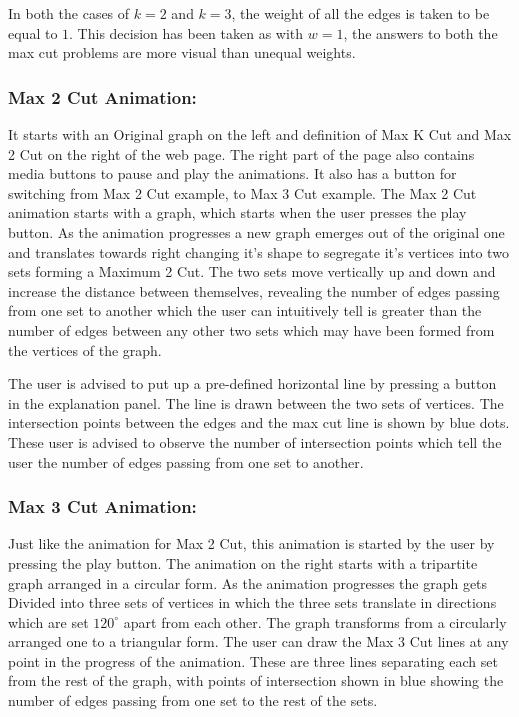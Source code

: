 In both the cases of $k=2$ and $k=3$, the weight of all the edges is taken to
be equal to $1$. This decision has been taken as with $w=1$, the answers to
both the max cut problems are more visual than unequal weights.

\subsubsection{Max 2 Cut Animation:} 
It starts with an Original graph on the left and definition of Max K Cut and
Max 2 Cut on the right of the web page. The right part of the page also
contains media buttons to pause and play the animations. It also has a button
for switching from Max 2 Cut example, to Max 3 Cut example.  The Max 2 Cut
animation starts with a graph, which starts when the user presses the play
button. As the animation progresses a new graph emerges out of the original
one and translates towards right changing it's shape to segregate it's
vertices into two sets forming a Maximum 2 Cut. The two sets move vertically up
and down and increase the distance between themselves, revealing the
number of edges passing from one set to another which the user can intuitively
tell is greater than the number of edges between any other two sets
which may have been formed from the vertices of the graph.

The user is advised to put up a pre-defined horizontal line by pressing a
button in the explanation panel. The line is drawn between the two sets of
vertices.  The intersection points between the edges and the max cut line is
shown by blue dots. These user is advised to observe the number of intersection
points which tell the user the number of edges passing from one set to another.

\subsubsection{Max 3 Cut Animation:}
Just like the animation for Max 2 Cut, this animation is started by the user by
pressing the play button. The animation on the right starts with a tripartite
graph arranged in a circular form. As the animation progresses the graph gets
Divided into three sets of vertices in which the three sets translate in
directions which are set $120^{\circ}$ apart from each other. The graph
transforms from a circularly arranged one to a triangular form. The user can
draw the Max 3 Cut lines at any point in the progress of the animation.  These
are three lines separating each set from the rest of the graph, with points of
intersection shown in blue showing the number of edges passing from one set to
the rest of the sets.

